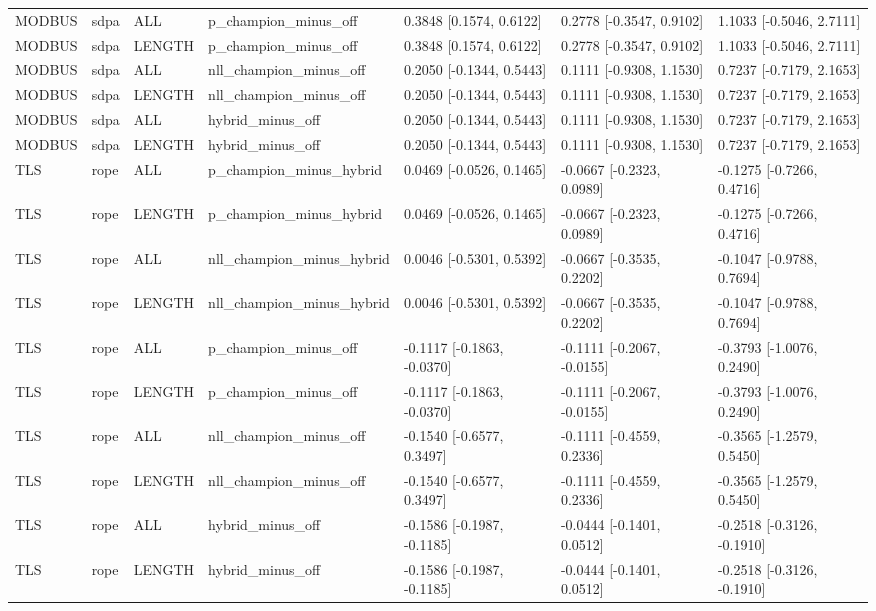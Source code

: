 \begin{tabular}{lllllll}
MODBUS & sdpa & ALL & p\_champion\_minus\_off & 0.3848 [0.1574, 0.6122] & 0.2778 [-0.3547, 0.9102] & 1.1033 [-0.5046, 2.7111] \\
MODBUS & sdpa & LENGTH & p\_champion\_minus\_off & 0.3848 [0.1574, 0.6122] & 0.2778 [-0.3547, 0.9102] & 1.1033 [-0.5046, 2.7111] \\
MODBUS & sdpa & ALL & nll\_champion\_minus\_off & 0.2050 [-0.1344, 0.5443] & 0.1111 [-0.9308, 1.1530] & 0.7237 [-0.7179, 2.1653] \\
MODBUS & sdpa & LENGTH & nll\_champion\_minus\_off & 0.2050 [-0.1344, 0.5443] & 0.1111 [-0.9308, 1.1530] & 0.7237 [-0.7179, 2.1653] \\
MODBUS & sdpa & ALL & hybrid\_minus\_off & 0.2050 [-0.1344, 0.5443] & 0.1111 [-0.9308, 1.1530] & 0.7237 [-0.7179, 2.1653] \\
MODBUS & sdpa & LENGTH & hybrid\_minus\_off & 0.2050 [-0.1344, 0.5443] & 0.1111 [-0.9308, 1.1530] & 0.7237 [-0.7179, 2.1653] \\
TLS & rope & ALL & p\_champion\_minus\_hybrid & 0.0469 [-0.0526, 0.1465] & -0.0667 [-0.2323, 0.0989] & -0.1275 [-0.7266, 0.4716] \\
TLS & rope & LENGTH & p\_champion\_minus\_hybrid & 0.0469 [-0.0526, 0.1465] & -0.0667 [-0.2323, 0.0989] & -0.1275 [-0.7266, 0.4716] \\
TLS & rope & ALL & nll\_champion\_minus\_hybrid & 0.0046 [-0.5301, 0.5392] & -0.0667 [-0.3535, 0.2202] & -0.1047 [-0.9788, 0.7694] \\
TLS & rope & LENGTH & nll\_champion\_minus\_hybrid & 0.0046 [-0.5301, 0.5392] & -0.0667 [-0.3535, 0.2202] & -0.1047 [-0.9788, 0.7694] \\
TLS & rope & ALL & p\_champion\_minus\_off & -0.1117 [-0.1863, -0.0370] & -0.1111 [-0.2067, -0.0155] & -0.3793 [-1.0076, 0.2490] \\
TLS & rope & LENGTH & p\_champion\_minus\_off & -0.1117 [-0.1863, -0.0370] & -0.1111 [-0.2067, -0.0155] & -0.3793 [-1.0076, 0.2490] \\
TLS & rope & ALL & nll\_champion\_minus\_off & -0.1540 [-0.6577, 0.3497] & -0.1111 [-0.4559, 0.2336] & -0.3565 [-1.2579, 0.5450] \\
TLS & rope & LENGTH & nll\_champion\_minus\_off & -0.1540 [-0.6577, 0.3497] & -0.1111 [-0.4559, 0.2336] & -0.3565 [-1.2579, 0.5450] \\
TLS & rope & ALL & hybrid\_minus\_off & -0.1586 [-0.1987, -0.1185] & -0.0444 [-0.1401, 0.0512] & -0.2518 [-0.3126, -0.1910] \\
TLS & rope & LENGTH & hybrid\_minus\_off & -0.1586 [-0.1987, -0.1185] & -0.0444 [-0.1401, 0.0512] & -0.2518 [-0.3126, -0.1910] \\

\end{tabular}
